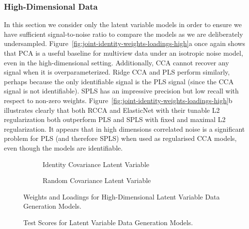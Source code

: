 \subsubsection{High-Dimensional Data}
In this section we consider only the latent variable models in order to ensure we have sufficient signal-to-noise ratio to compare the models as we are deliberately undersampled.
Figure~\ref{fig:joint-identity-weights-loadings-high}a once again shows that PCA is a useful baseline for multiview data under an isotropic noise model, even in the high-dimensional setting.
Additionally, CCA cannot recover any signal when it is overparameterized.
Ridge CCA and PLS perform similarly, perhaps because the only identifiable signal is the PLS signal (since the CCA signal is not identifiable).
SPLS has an impressive precision but low recall with respect to non-zero weights.
Figure~\ref{fig:joint-identity-weights-loadings-high}b illustrates clearly that both RCCA and ElasticNet with their tunable L2 regularization both outperform PLS and SPLS with fixed and maximal L2 regularization.
It appears that in high dimensions correlated noise is a significant problem for PLS (and therefore SPLS) when used as regularised CCA models, even though the models are identifiable.

\begin{figure}
\centering
\begin{subfigure}{0.49\linewidth}
\centering

\caption{Identity Covariance Latent Variable}
\end{subfigure}
%
\begin{subfigure}{0.49\linewidth}
\centering

\caption{Random Covariance Latent Variable}
\end{subfigure}
\caption{Weights and Loadings for High-Dimensional Latent Variable Data Generation Models.}\label{fig:latent-variable-weights-loadings-high}
\end{figure}

\begin{figure}
\centering
\begin{subfigure}{0.49\linewidth}
\centering

\caption{}
\end{subfigure}
%
\begin{subfigure}{0.49\linewidth}
\centering

\caption{}
\end{subfigure}
\caption{Test Scores for Latent Variable Data Generation Models.}\label{fig:latent-variable-scores-high}
\end{figure}

